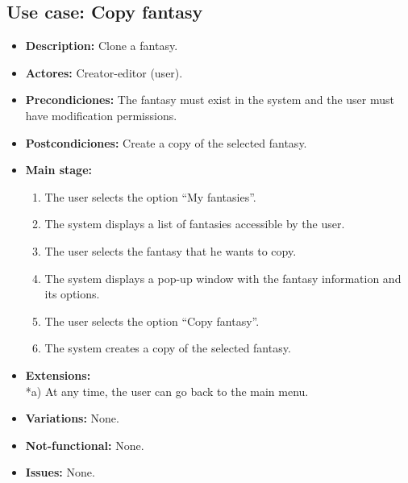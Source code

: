 \subsection{Use case: Copy fantasy}
\begin{itemize}
	\item \textbf{Description:} Clone a fantasy.
	\item \textbf{Actores:} Creator-editor (user).
	\item \textbf{Precondiciones:} The fantasy must exist in the system and the user must have modification permissions.
	\item \textbf{Postcondiciones:} Create a copy of the selected fantasy.
	\item \textbf{Main stage:}
	\begin{enumerate}
		\item The user selects the option ``My fantasies''.
		\item The system displays a list of fantasies accessible by the user.
		\item The user selects the fantasy that he wants to copy.
		\item The system displays a pop-up window with the fantasy information and its options.
		\item The user selects the option ``Copy fantasy''.
		\item The system creates a copy of the selected fantasy.
	\end{enumerate}
	\item \textbf{Extensions:} \\ *a) At any time, the user can go back to the main menu.
	\item \textbf{Variations:} None.
	\item \textbf{Not-functional:} None.
	\item \textbf{Issues:} None.
\end{itemize}


